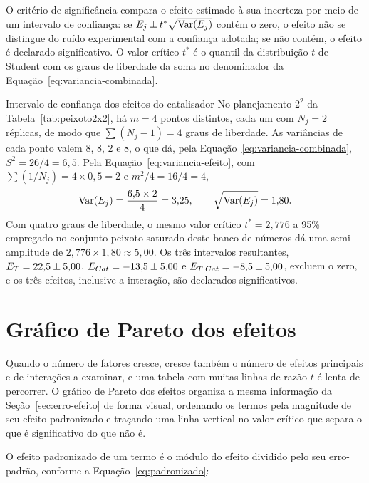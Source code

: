 \documentclass{doeapostila}
\begin{document}
O critério de significância compara o efeito estimado à sua incerteza por
meio de um intervalo de confiança: se
$E_{j} \pm t^{*}\sqrt{\mathrm{Var}(E_{j})}$ contém o zero, o efeito
não se distingue do ruído experimental com a confiança adotada; se não
contém, o efeito é declarado significativo. O valor crítico $t^{*}$ é o
quantil da distribuição $t$ de Student com os graus de liberdade da soma no
denominador da Equação~\eqref{eq:variancia-combinada}.

\begin{aplicacao}{Intervalo de confiança dos efeitos do catalisador}
  No planejamento $2^{2}$ da Tabela~\ref{tab:peixoto2x2}, há $m = 4$ pontos
  distintos, cada um com $N_{j} = 2$ réplicas, de modo que
  $\sum (N_{j}-1) = 4$ graus de liberdade. As variâncias de cada ponto valem
  \num{8}, \num{8}, \num{2} e \num{8}, o que dá, pela
  Equação~\eqref{eq:variancia-combinada}, $S^{2} = 26/4 = 6{,}5$. Pela
  Equação~\eqref{eq:variancia-efeito}, com $\sum(1/N_{j}) = 4 \times 0{,}5 = 2$
  e $m^{2}/4 = 16/4 = 4$,
  \[
    \mathrm{Var}(E_{j}) = \frac{6{,}5 \times 2}{4} = 3{,}25 ,
    \qquad \sqrt{\mathrm{Var}(E_{j})} = 1{,}80 .
  \]
  Com quatro graus de liberdade, o mesmo valor crítico $t^{*} = 2{,}776$ a
  95\% empregado no conjunto peixoto-saturado deste banco de números dá uma
  semi-amplitude de $2{,}776 \times 1{,}80 \approx 5{,}00$. Os três
  intervalos resultantes,
  $E_{T} = 22{,}5 \pm 5{,}00$, $E_{Cat} = -13{,}5 \pm 5{,}00$ e
  $E_{T \cdot Cat} = -8{,}5 \pm 5{,}00$, excluem o zero, e os três
  efeitos, inclusive a interação, são declarados significativos.
\end{aplicacao}

\section{Gráfico de Pareto dos efeitos}
\label{sec:pareto}

Quando o número de fatores cresce, cresce também o número de efeitos
principais e de interações a examinar, e uma tabela com muitas linhas de
razão $t$ é lenta de percorrer. O gráfico de Pareto dos efeitos organiza a
mesma informação da Seção~\ref{sec:erro-efeito} de forma visual, ordenando
os termos pela magnitude de seu efeito padronizado e traçando uma linha
vertical no valor crítico que separa o que é significativo do que não é.

O efeito padronizado de um termo é o módulo do efeito dividido pelo seu
erro-padrão, conforme a Equação~\eqref{eq:padronizado}:
\end{document}
